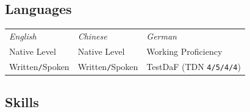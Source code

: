 \documentclass[11pt]{article}
\begin{document}
	\subsection*{Languages}
		\begin{center}
			\begin{tabular}{@{} p{4cm} p{4cm} p{4.1cm} @{}}
				\textcolor{subheader}{\textit{English}} & \textcolor{subheader}{\textit{Chinese}} & \textcolor{subheader}{\textit{German}} \\
				Native Level & Native Level & Working Proficiency \\ 
				\textcolor{subtitles}{Written\texttt{/}Spoken} & \textcolor{subtitles}{Written\texttt{/}Spoken} & TestDaF (TDN \texttt{4/5/4/4})
			\end{tabular}
		\end{center}
	\subsection*{Skills}
	\vspace{-\parskip}
\end{document}
